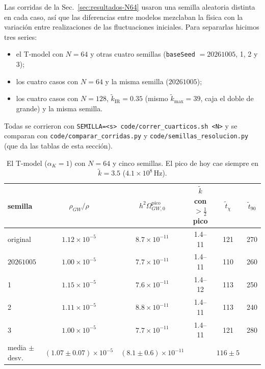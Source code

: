 \documentclass[11pt]{article}
\begin{document}
            Las corridas de la Sec.~\ref{sec:resultados-N64} usaron una semilla aleatoria distinta en cada caso, así que las diferencias entre modelos mezclaban la física con la variación entre realizaciones de las fluctuaciones iniciales. Para separarlas hicimos tres series:
            \begin{itemize}
                \item el T-model con $N = 64$ y otras cuatro semillas (\texttt{baseSeed} $= 20261005$, 1, 2 y 3);
                \item los cuatro casos con $N = 64$ y la misma semilla ($20261005$);
                \item los cuatro casos con $N = 128$, $\tilde k_{\text{IR}} = 0.35$ (mismo $\tilde k_{\max} = 39$, caja el doble de grande) y la misma semilla.
            \end{itemize}
            Todas se corrieron con \texttt{SEMILLA=<s> code/correr\_cuarticos.sh <N>} y se comparan con \texttt{code/comparar\_corridas.py} y \texttt{code/semillas\_resolucion.py} (que da las tablas de esta sección).

            \begin{table}[H]
                \centering
                \small
                \begin{tabular}{lccccc}
                    \toprule
                    semilla & $\rho_{GW}/\rho$ & $h^2\Omega_{GW,0}^{\text{pico}}$ & $\tilde k$ con $> \frac12$ pico & $\tilde t_\chi$ & $\tilde t_{90}$ \\
                    \midrule
                    original & $1.12 \times 10^{-5}$ & $8.7 \times 10^{-11}$ & 1.4--11 & 121 & 270 \\
                    $20261005$ & $1.00 \times 10^{-5}$ & $7.7 \times 10^{-11}$ & 1.4--11 & 110 & 260 \\
                    1 & $1.15 \times 10^{-5}$ & $7.6 \times 10^{-11}$ & 1.4--12 & 113 & 250 \\
                    2 & $1.11 \times 10^{-5}$ & $8.8 \times 10^{-11}$ & 1.4--11 & 113 & 240 \\
                    3 & $1.00 \times 10^{-5}$ & $7.7 \times 10^{-11}$ & 1.4--11 & 121 & 280 \\
                    \midrule
                    media $\pm$ desv. & $(1.07 \pm 0.07) \times 10^{-5}$ & $(8.1 \pm 0.6) \times 10^{-11}$ & & $116 \pm 5$ & \\
                    \bottomrule
                \end{tabular}
                \caption{El T-model ($\alpha_K = 1$) con $N = 64$ y cinco semillas. El pico de hoy cae siempre en $\tilde k = 3.5$ ($4.1 \times 10^8$\,Hz).}
                \label{tab:semillas-T}
            \end{table}
\end{document}
